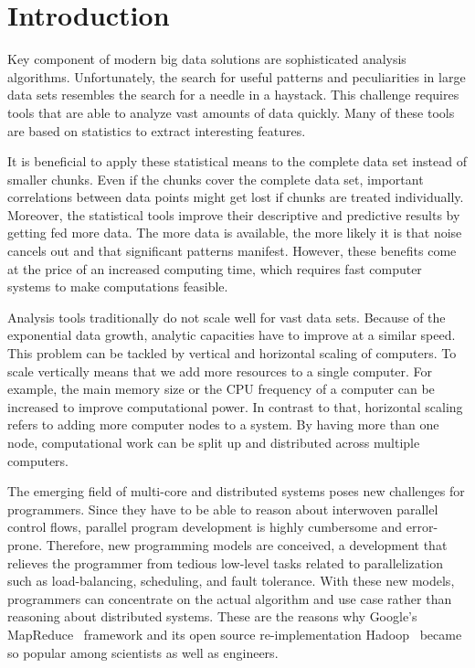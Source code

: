 \section{Introduction}

Key component of modern big data solutions are sophisticated analysis algorithms. 
Unfortunately, the search for useful patterns and peculiarities in large data sets resembles the search for a needle in a haystack. 
This challenge requires tools that are able to analyze vast amounts of data quickly. 
Many of these tools are based on statistics to extract interesting features. 

It is beneficial to apply these statistical means to the complete data set instead of smaller chunks. 
Even if the chunks cover the complete data set, important correlations between data points might get lost if chunks are treated individually. 
Moreover, the statistical tools improve their descriptive and predictive results by getting fed more data. 
The more data is available, the more likely it is that noise cancels out and that significant patterns manifest. 
However, these benefits come at the price of an increased computing time, which requires fast computer systems to make computations feasible. 

Analysis tools traditionally do not scale well for vast data sets.
Because of the exponential data growth, analytic capacities have to improve at a similar speed.
This problem can be tackled by vertical and horizontal scaling of computers.
To scale vertically means that we add more resources to a single computer.
For example, the main memory size or the CPU frequency of a computer can be increased to improve computational power.
In contrast to that, horizontal scaling refers to adding more computer nodes to a system.
By having more than one node, computational work can be split up and distributed across multiple computers.

The emerging field of multi-core and distributed systems poses new challenges for programmers.
Since they have to be able to reason about interwoven parallel control flows, parallel program development is highly cumbersome and error-prone.
Therefore, new programming models are conceived, a development that relieves the programmer from tedious low-level tasks related to parallelization such as load-balancing, scheduling, and fault tolerance.
With these new models, programmers can concentrate on the actual algorithm and use case rather than reasoning about distributed systems. 
These are the reasons why Google's MapReduce~\cite{dean:c2008a} framework and its open source re-implementation Hadoop~\cite{hadoop:2008a} became so popular among scientists as well as engineers.

